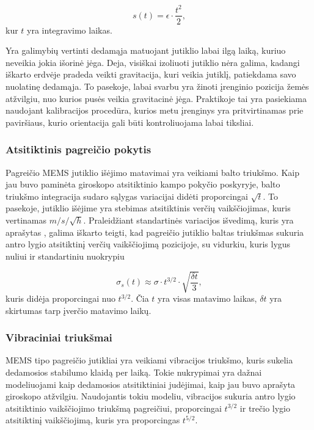 \begin{equation}
    s(t) = \epsilon \cdot \frac{t^2}{2},
\end{equation}
kur $t$ yra integravimo laikas.

Yra galimybių vertinti dedamąja matuojant jutiklio labai ilgą laiką, kuriuo neveikia jokia išorinė jėga. Deja, visiškai izoliuoti jutiklio nėra galima, kadangi iškarto erdvėje pradeda veikti gravitacija, kuri veikia jutiklį, patiekdama savo nuolatinę dedamąja. To pasekoje, labai svarbu yra žinoti įrenginio pozicija žemės atžvilgiu, nuo kurios pusės veikia gravitacinė jėga. Praktikoje tai yra pasiekiama naudojant kalibracijos procedūra, kurios metu įrenginys yra pritvirtinamas prie paviršiaus, kurio orientacija gali būti kontroliuojama labai tiksliai.

\subsubsection{Atsitiktinis pagreičio pokytis}

Pagreičio MEMS jutiklio išėjimo matavimai yra veikiami balto triukšmo. Kaip jau buvo paminėta giroskopo atsitiktinio kampo pokyčio poskyryje, balto triukšmo integracija sudaro sąlygas variacijai didėti proporcingai $\sqrt{t}$. To pasekoje, jutiklio išėjime yra stebimas atsitiktinis verčių vaikščiojimas, kuris vertinamas $m/s/\sqrt{h}$. Praleidžiant standartinės variacijos išvedimą, kuris yra aprašytas \cite{woodman2007introduction}, galima iškarto teigti, kad pagreičio jutiklio baltas triukšmas sukuria antro lygio atsitiktinį verčių vaikščiojimą pozicijoje, su vidurkiu, kuris lygus nuliui ir standartiniu nuokrypiu

\begin{equation}
    \sigma_{s}(t) \approx \sigma \cdot t^{3/2} \cdot \sqrt{\frac{\delta t}{3}},
\end{equation}
kuris didėja proporcingai nuo $t^{3/2}$. Čia $t$ yra visas matavimo laikas, $\delta t$ yra skirtumas tarp įverčio matavimo laikų.

\subsubsection{Vibraciniai triukšmai}

MEMS tipo pagreičio jutikliai yra veikiami vibracijos triukšmo, kuris sukelia dedamosios stabilumo klaidą per laiką. Tokie nukrypimai yra dažnai modeliuojami kaip dedamosios atsitiktiniai judėjimai, kaip jau buvo aprašyta giroskopo atžvilgiu. Naudojantis tokiu modeliu, vibracijos sukuria antro lygio atsitiktinio vaikščiojimo triukšmą pagreičiui, proporcingai $t^{3/2}$ ir trečio lygio atsitiktinį vaikščiojimą, kuris yra proporcingas $t^{5/2}$.

